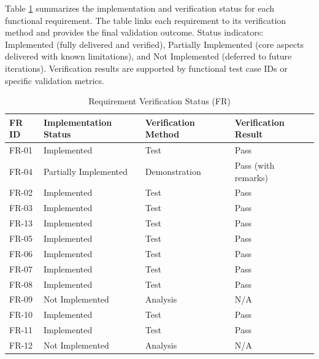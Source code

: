 \newpage
Table \ref{tab:fr_verification} summarizes the implementation and verification status for each functional requirement. The table links each requirement to its verification method and provides the final validation outcome. Status indicators: Implemented (fully delivered and verified), Partially Implemented (core aspects delivered with known limitations), and Not Implemented (deferred to future iterations). Verification results are supported by functional test case IDs or specific validation metrics.

\begin{table}[ht]
\centering
\small
\caption{Requirement Verification Status (FR)}
\label{tab:fr_verification}
\renewcommand{\arraystretch}{2}
\begin{tabular}{p{1.6cm}p{4.4cm}p{4.4cm}p{4.4cm}}
    \toprule
    \textbf{FR ID} & \textbf{Implementation Status} & \textbf{Verification Method} & \textbf{Verification Result} \\
    \midrule
    FR-01 & 
    Implemented &
    Test  &
    Pass
      \\

    FR-04      &
    Partially Implemented &
    Demonstration  &
    Pass (with remarks) \\

    FR-02 &
    Implemented &
    Test  & 
    Pass
      \\

    FR-03      &
    Implemented &
    Test  &
    Pass
      \\

    FR-13      &
    Implemented &
    Test  &
    Pass
      \\

    FR-05 &
    Implemented &
    Test  &
    Pass
      \\
    
    FR-06      &
    Implemented &
    Test  & 
    Pass
      \\
    
    FR-07      &
    Implemented &
    Test  &
    Pass
      \\
    
    FR-08      &
    Implemented &
    Test  &
    Pass
      \\

    FR-09      &
    Not Implemented &
    Analysis&
    N/A  \\
    
    FR-10 &
    Implemented &
    Test   &
    Pass
       \\
    
    FR-11      &
    Implemented &
    Test   & 
    Pass
     \\
    
    FR-12      &
    Not Implemented &
    Analysis  &
    N/A\\
    
    \bottomrule
\end{tabular}
\end{table}

